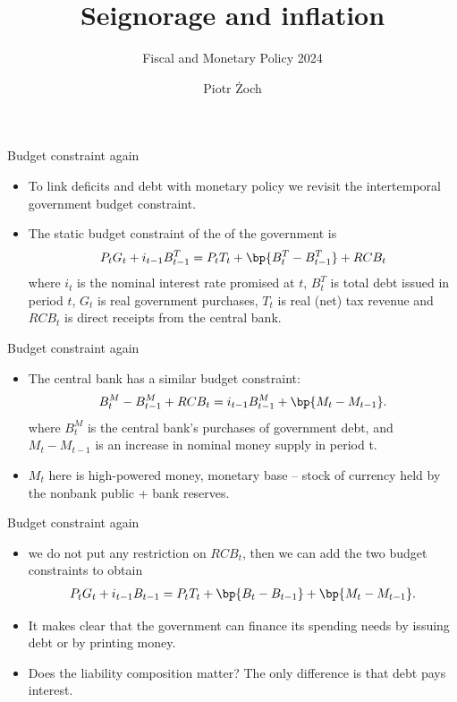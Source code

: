 \documentclass[11pt,xcolor={dvipsnames},aspectratio=159,hyperref={pdftex,pdfpagemode=UseNone,hidelinks,pdfdisplaydoctitle=true},usepdftitle=false]{beamer}
\begin{document}
\title{Seignorage and inflation}
\subtitle{Fiscal and Monetary Policy 2024}

\author{Piotr Żoch}%
\frame{\titlepage}

\begin{frame}{Budget constraint again}
    \begin{itemize}
    \item To link deficits and debt with monetary policy we revisit the intertemporal government budget constraint.
    \item The static budget constraint of the  of the government is \begin{align*}
       P_t G_t + i_{t-1} B^T_{t-1} = P_t T_t + \bp{B^T_t-B^T_{t-1}} + RCB_t
    \end{align*}
    where $i_t$ is the nominal interest rate promised at $t$, $B^T_t$
    is total  debt issued in period $t$, $G_t$ is real government purchases, $T_t$
    is real (net) tax revenue and $RCB_t$ is direct receipts from the
    central bank.
    \end{itemize}
\end{frame}

\begin{frame}{Budget constraint again}
    \begin{itemize}
    \item The central bank has a similar budget constraint: 
    \begin{align*}
        B^M_t - B^M_{t-1} + RCB_t = i_{t-1} B^M_{t-1} + \bp{M_t - M_{t-1}}.
    \end{align*}
    where $B^M_t$ is the central bank's purchases of government debt, and
    $M_t - M_{t-1}$ is an increase in nominal money supply in period t.
    \item $M_t$ here is high-powered money, monetary base --  stock of currency held by the nonbank public + bank reserves.
    \end{itemize}
\end{frame}

\begin{frame}{Budget constraint again}
    \begin{itemize}
    \item {} we do not put any restriction on $RCB_t$, then we can add the two budget constraints to obtain \begin{align*}
        P_t G_t + i_{t-1} B_{t-1} = P_t T_t + \bp{B_t-B_{t-1}} + \bp{M_t - M_{t-1}}.
    \end{align*}
    \item It makes clear that the government can finance its spending needs by issuing debt or by printing money.
    \item Does the liability composition matter? The only difference is that debt pays interest. 
    \end{itemize}
\end{frame}
\end{document}
